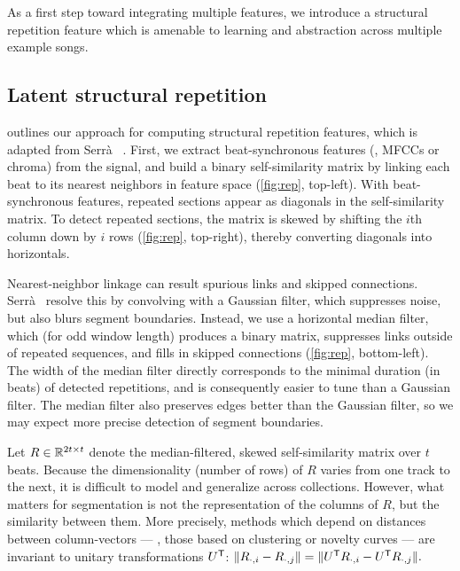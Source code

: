 \documentclass{article}
\begin{document}
As a first step toward integrating multiple features, we introduce a structural repetition feature
which is amenable to learning and abstraction across multiple example songs.

\subsection{Latent structural repetition}
 outlines our approach for computing structural repetition features, which is adapted from
Serr\`{a} \etal~\cite{serra2012unsupervised}.  First, we extract beat-synchronous features (\eg, MFCCs or chroma) 
from the signal, and build a binary self-similarity matrix by linking each beat to its nearest neighbors in feature
space (\cref{fig:rep}, top-left). With beat-synchronous features, repeated sections appear as diagonals in the self-similarity
matrix. To detect repeated sections, the matrix is skewed by shifting the $i$th column down by $i$ rows
(\cref{fig:rep}, top-right), thereby converting diagonals into horizontals.

Nearest-neighbor linkage can result spurious links and skipped connections. 
Serr\`{a}~\etal{} resolve this by convolving with a Gaussian filter, which suppresses noise, but also blurs
segment boundaries. Instead, we use a horizontal median filter, which (for odd window length) produces a binary matrix,
suppresses links outside of repeated sequences, and fills in skipped connections (\cref{fig:rep},
bottom-left).  The width of the median filter directly corresponds to the minimal duration (in beats) of detected repetitions,
and is consequently easier to tune than a Gaussian filter.
The median filter also preserves edges better than the Gaussian filter, so we may expect more precise detection of segment boundaries.

Let $R \in \mathbb{R}^{2t \times t}$ denote the median-filtered, skewed self-similarity matrix over $t$ beats.  
Because the dimensionality (number of rows) of $R$ varies from one track to the next,
it is difficult to model and generalize across collections.
However, what matters for segmentation is not the representation of the columns of $R$, but the similarity between them.
More precisely, methods which depend on distances between column-vectors --- \ie, those based on clustering or novelty curves --- 
are invariant to unitary transformations $U^\mathsf{T}$:
$
\|R_{\cdot, i} - R_{\cdot, j}\| = \|U^\mathsf{T} R_{\cdot, i} - U^\mathsf{T} R_{\cdot, j}\|.
$ 
\end{document}
